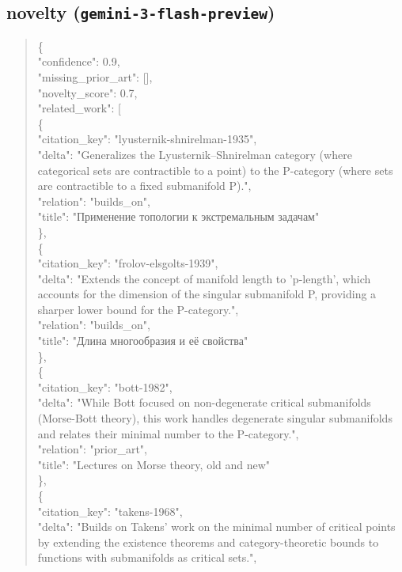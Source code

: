 \documentclass[11pt]{article}
\begin{document}
\subsection*{novelty (\texttt{gemini-3-flash-preview})}
\begin{quote}\small\ttfamily\raggedright
\{\\
  "confidence": 0.9,\\
  "missing\_prior\_art": [],\\
  "novelty\_score": 0.7,\\
  "related\_work": [\\
    \{\\
      "citation\_key": "lyusternik-shnirelman-1935",\\
      "delta": "Generalizes the Lyusternik--Shnirelman category (where categorical sets are contractible to a point) to the P-category (where sets are contractible to a fixed submanifold P).",\\
      "relation": "builds\_on",\\
      "title": "Применение топологии к экстремальным задачам"\\
    \},\\
    \{\\
      "citation\_key": "frolov-elsgolts-1939",\\
      "delta": "Extends the concept of manifold length to 'p-length', which accounts for the dimension of the singular submanifold P, providing a sharper lower bound for the P-category.",\\
      "relation": "builds\_on",\\
      "title": "Длина многообразия и её свойства"\\
    \},\\
    \{\\
      "citation\_key": "bott-1982",\\
      "delta": "While Bott focused on non-degenerate critical submanifolds (Morse-Bott theory), this work handles degenerate singular submanifolds and relates their minimal number to the P-category.",\\
      "relation": "prior\_art",\\
      "title": "Lectures on Morse theory, old and new"\\
    \},\\
    \{\\
      "citation\_key": "takens-1968",\\
      "delta": "Builds on Takens' work on the minimal number of critical points by extending the existence theorems and category-theoretic bounds to functions with submanifolds as critical sets.",\\

\end{quote}
\end{document}
